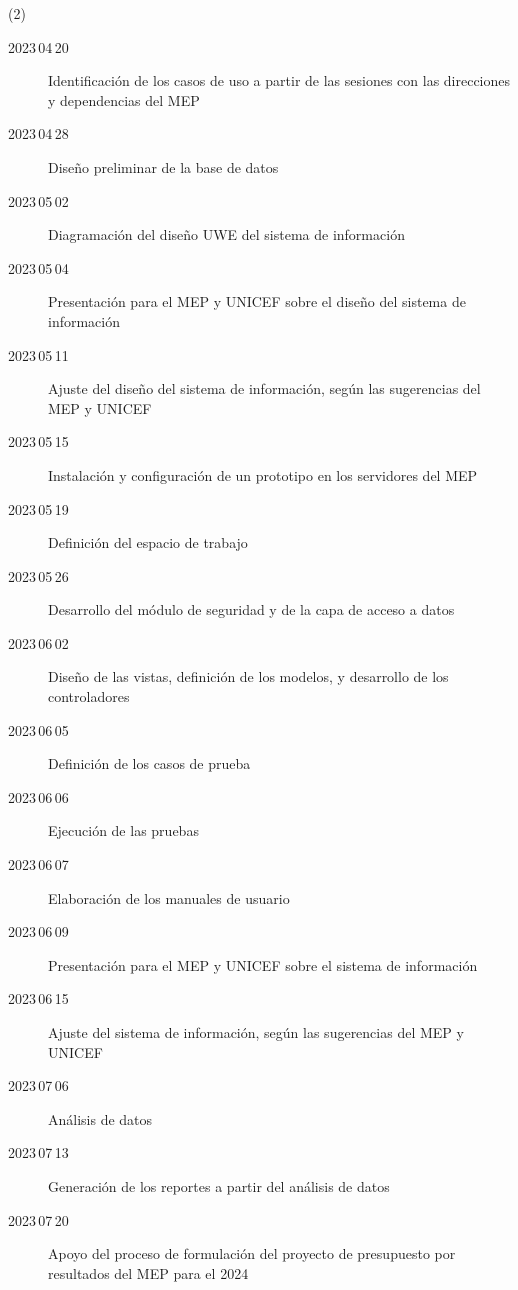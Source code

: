 \documentclass[a4paper, 9pt, conference]{article}              %
\theoremstyle{definition}
\begin{document}
\begin{tasks}[](2)
	\task[]
	\begin{description}
		\item[2023\,04\,20] Identificaci\'on de los casos de uso a partir de las sesiones con las direcciones y dependencias del MEP
		\item[2023\,04\,28] Dise\~no preliminar de la base de datos
		\item[2023\,05\,02] Diagramaci\'on del dise\~no UWE del sistema de informaci\'on
		\item[2023\,05\,04] Presentaci\'on para el MEP y UNICEF sobre el dise\~no del sistema de informaci\'on
		\item[2023\,05\,11] Ajuste del dise\~no del sistema de informaci\'on, seg\'un las sugerencias del MEP y UNICEF
	\end{description}
	\task[]
	\begin{description}
		\item[2023\,05\,15] Instalaci\'on y configuraci\'on de un prototipo en los servidores del MEP
		\item[2023\,05\,19] Definici\'on del espacio de trabajo
		\item[2023\,05\,26] Desarrollo del m\'odulo de seguridad y de la capa de acceso a datos
		\item[2023\,06\,02] Dise\~no de las vistas, definici\'on de los modelos, y desarrollo de los controladores
		\item[2023\,06\,05] Definici\'on de los casos de prueba
		\item[2023\,06\,06] Ejecuci\'on de las pruebas
		\item[2023\,06\,07] Elaboraci\'on de los manuales de usuario
		\item[2023\,06\,09] Presentaci\'on para el MEP y UNICEF sobre el sistema de informaci\'on
		\item[2023\,06\,15] Ajuste del sistema de informaci\'on, seg\'un las sugerencias del MEP y UNICEF
	\end{description}
	\task[]
	\begin{description}
		\item[2023\,07\,06] An\'alisis de datos
		\item[2023\,07\,13] Generaci\'on de los reportes a partir del an\'alisis de datos
		\item[2023\,07\,20] Apoyo del proceso de formulaci\'on del proyecto de presupuesto por resultados del MEP para el 2024
	\end{description}
	\task[]
	\begin{description}

\end{description}
\end{tasks}
\end{document}
